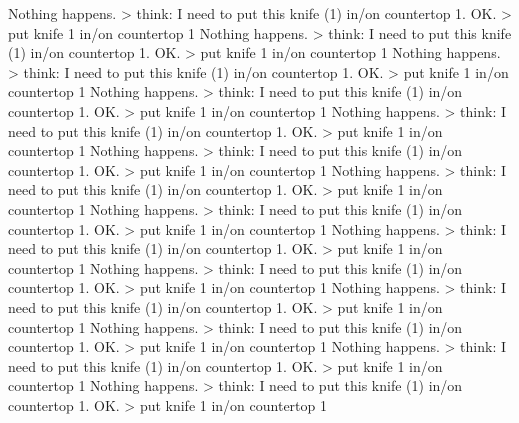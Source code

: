 \documentclass[
]{article}
\newenvironment{Shaded}{}{}
\newcommand{\NormalTok}[1]{#1}
\begin{document}
\begin{Shaded}
\begin{Highlighting}[]
\NormalTok{Nothing happens.}
\NormalTok{\textgreater{} think: I need to put this knife (1) in/on countertop 1.}
\NormalTok{OK.}
\NormalTok{\textgreater{} put knife 1 in/on countertop 1}
\NormalTok{Nothing happens.}
\NormalTok{\textgreater{} think: I need to put this knife (1) in/on countertop 1.}
\NormalTok{OK.}
\NormalTok{\textgreater{} put knife 1 in/on countertop 1}
\NormalTok{Nothing happens.}
\NormalTok{\textgreater{} think: I need to put this knife (1) in/on countertop 1.}
\NormalTok{OK.}
\NormalTok{\textgreater{} put knife 1 in/on countertop 1}
\NormalTok{Nothing happens.}
\NormalTok{\textgreater{} think: I need to put this knife (1) in/on countertop 1.}
\NormalTok{OK.}
\NormalTok{\textgreater{} put knife 1 in/on countertop 1}
\NormalTok{Nothing happens.}
\NormalTok{\textgreater{} think: I need to put this knife (1) in/on countertop 1.}
\NormalTok{OK.}
\NormalTok{\textgreater{} put knife 1 in/on countertop 1}
\NormalTok{Nothing happens.}
\NormalTok{\textgreater{} think: I need to put this knife (1) in/on countertop 1.}
\NormalTok{OK.}
\NormalTok{\textgreater{} put knife 1 in/on countertop 1}
\NormalTok{Nothing happens.}
\NormalTok{\textgreater{} think: I need to put this knife (1) in/on countertop 1.}
\NormalTok{OK.}
\NormalTok{\textgreater{} put knife 1 in/on countertop 1}
\NormalTok{Nothing happens.}
\NormalTok{\textgreater{} think: I need to put this knife (1) in/on countertop 1.}
\NormalTok{OK.}
\NormalTok{\textgreater{} put knife 1 in/on countertop 1}
\NormalTok{Nothing happens.}
\NormalTok{\textgreater{} think: I need to put this knife (1) in/on countertop 1.}
\NormalTok{OK.}
\NormalTok{\textgreater{} put knife 1 in/on countertop 1}
\NormalTok{Nothing happens.}
\NormalTok{\textgreater{} think: I need to put this knife (1) in/on countertop 1.}
\NormalTok{OK.}
\NormalTok{\textgreater{} put knife 1 in/on countertop 1}
\NormalTok{Nothing happens.}
\NormalTok{\textgreater{} think: I need to put this knife (1) in/on countertop 1.}
\NormalTok{OK.}
\NormalTok{\textgreater{} put knife 1 in/on countertop 1}
\NormalTok{Nothing happens.}
\NormalTok{\textgreater{} think: I need to put this knife (1) in/on countertop 1.}
\NormalTok{OK.}
\NormalTok{\textgreater{} put knife 1 in/on countertop 1}
\NormalTok{Nothing happens.}
\NormalTok{\textgreater{} think: I need to put this knife (1) in/on countertop 1.}
\NormalTok{OK.}
\NormalTok{\textgreater{} put knife 1 in/on countertop 1}
\NormalTok{Nothing happens.}
\NormalTok{\textgreater{} think: I need to put this knife (1) in/on countertop 1.}
\NormalTok{OK.}
\NormalTok{\textgreater{} put knife 1 in/on countertop 1}

\end{Highlighting}
\end{Shaded}
\end{document}
